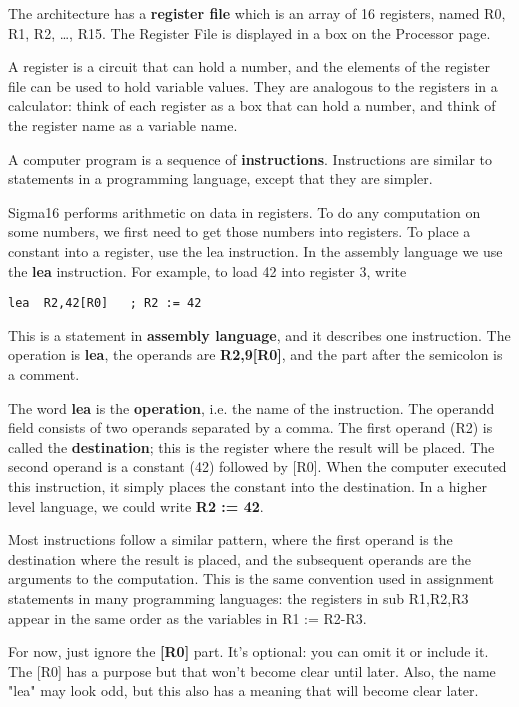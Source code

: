 \documentclass[11pt]{article}
\begin{document}
\begin{itemize}
The architecture has a \textbf{\textbf{register file}} which is an array of 16
registers, named R0, R1, R2, \ldots{}, R15.  The Register File is displayed
in a box on the Processor page.

A register is a circuit that can hold a number, and the elements of
the register file can be used to hold variable values.  They are
analogous to the registers in a calculator: think of each register as
a box that can hold a number, and think of the register name as a
variable name.

A computer program is a sequence of \textbf{\textbf{instructions}}.  Instructions
are similar to statements in a programming language, except that they
are simpler.

Sigma16 performs arithmetic on data in registers.  To do any
computation on some numbers, we first need to get those numbers into
registers.  To place a constant into a register, use the lea
instruction.  In the assembly language we use the \textbf{\textbf{lea}} instruction.
For example, to load 42 into register 3, write

\begin{verbatim}
lea  R2,42[R0]   ; R2 := 42
\end{verbatim}

This is a statement in \textbf{\textbf{assembly language}}, and it describes one
instruction.  The operation is \textbf{\textbf{lea}}, the operands are \textbf{\textbf{R2,9[R0]}},
and the part after the semicolon is a comment.

The word \textbf{lea} is the \textbf{operation}, i.e. the name of the instruction.
The operandd field consists of two operands separated by a comma.  The
first operand (R2) is called the \textbf{destination}; this is the register
where the result will be placed.  The second operand is a constant
(42) followed by [R0].  When the computer executed this instruction,
it simply places the constant into the destination.  In a higher level
language, we could write \textbf{R2 := 42}.    

Most instructions follow a similar pattern, where the first operand is
the destination where the result is placed, and the subsequent
operands are the arguments to the computation.  This is the same
convention used in assignment statements in many programming
languages: the registers in sub R1,R2,R3 appear in the same order as
the variables in R1 := R2-R3.

For now, just ignore the \textbf{\textbf{[R0]}} part.  It's optional: you can omit
it or include it.  The [R0] has a purpose but that won't become clear
until later.  Also, the name "lea" may look odd, but this also has a
meaning that will become clear later.


\end{itemize}
\end{document}
